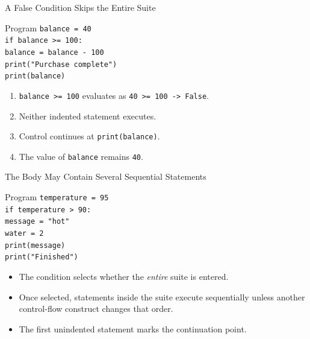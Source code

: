 \documentclass[aspectratio=169,10pt]{beamer}
\begin{document}
\begin{frame}{A False Condition Skips the Entire Suite}
  \begin{block}{Program}
    \texttt{balance = 40}\\
    \texttt{if balance >= 100:}\\
    \hspace*{0.20in}\texttt{balance = balance - 100}\\
    \hspace*{0.20in}\texttt{print("Purchase complete")}\\
    \texttt{print(balance)}
  \end{block}

  \begin{enumerate}
    \item \texttt{balance >= 100} evaluates as \texttt{40 >= 100 -> False}.
    \item Neither indented statement executes.
    \item Control continues at \texttt{print(balance)}.
    \item The value of \texttt{balance} remains \texttt{40}.
  \end{enumerate}
\end{frame}

\begin{frame}{The Body May Contain Several Sequential Statements}
  \begin{block}{Program}
    \texttt{temperature = 95}\\
    \texttt{if temperature > 90:}\\
    \hspace*{0.20in}\texttt{message = "hot"}\\
    \hspace*{0.20in}\texttt{water = 2}\\
    \hspace*{0.20in}\texttt{print(message)}\\
    \texttt{print("Finished")}
  \end{block}

  \begin{itemize}
    \item The condition selects whether the \emph{entire} suite is entered.
    \item Once selected, statements inside the suite execute sequentially unless another control-flow construct changes that order.
    \item The first unindented statement marks the continuation point.
  \end{itemize}
\end{frame}
\end{document}
